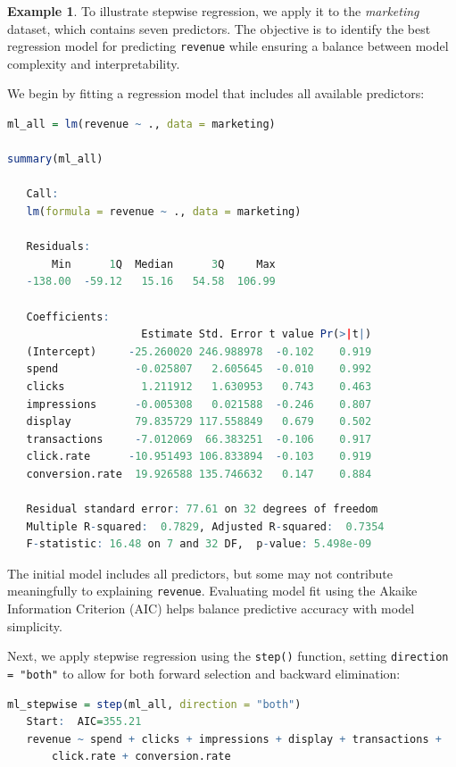 \documentclass[
  11pt,
]{book}
\newcommand{\passthrough}[1]{#1}
\theoremstyle{definition}
\theoremstyle{definition}
\newtheorem{example}{Example}[chapter]
\theoremstyle{definition}
\theoremstyle{definition}
\theoremstyle{remark}
\begin{document}
\begin{example}
\protect\hypertarget{exm:ex-stepwise-regression}{}\label{exm:ex-stepwise-regression}To illustrate stepwise regression, we apply it to the \emph{marketing} dataset, which contains seven predictors. The objective is to identify the best regression model for predicting \passthrough{\lstinline!revenue!} while ensuring a balance between model complexity and interpretability.

We begin by fitting a regression model that includes all available predictors:

\begin{lstlisting}[language=R]
ml_all = lm(revenue ~ ., data = marketing)

summary(ml_all)
   
   Call:
   lm(formula = revenue ~ ., data = marketing)
   
   Residuals:
       Min      1Q  Median      3Q     Max 
   -138.00  -59.12   15.16   54.58  106.99 
   
   Coefficients:
                     Estimate Std. Error t value Pr(>|t|)
   (Intercept)     -25.260020 246.988978  -0.102    0.919
   spend            -0.025807   2.605645  -0.010    0.992
   clicks            1.211912   1.630953   0.743    0.463
   impressions      -0.005308   0.021588  -0.246    0.807
   display          79.835729 117.558849   0.679    0.502
   transactions     -7.012069  66.383251  -0.106    0.917
   click.rate      -10.951493 106.833894  -0.103    0.919
   conversion.rate  19.926588 135.746632   0.147    0.884
   
   Residual standard error: 77.61 on 32 degrees of freedom
   Multiple R-squared:  0.7829, Adjusted R-squared:  0.7354 
   F-statistic: 16.48 on 7 and 32 DF,  p-value: 5.498e-09
\end{lstlisting}

The initial model includes all predictors, but some may not contribute meaningfully to explaining \passthrough{\lstinline!revenue!}. Evaluating model fit using the Akaike Information Criterion (AIC) helps balance predictive accuracy with model simplicity.

Next, we apply stepwise regression using the \passthrough{\lstinline!step()!} function, setting \passthrough{\lstinline!direction = "both"!} to allow for both forward selection and backward elimination:

\begin{lstlisting}[language=R]
ml_stepwise = step(ml_all, direction = "both")
   Start:  AIC=355.21
   revenue ~ spend + clicks + impressions + display + transactions + 
       click.rate + conversion.rate
   

\end{lstlisting}
\end{example}
\end{document}
